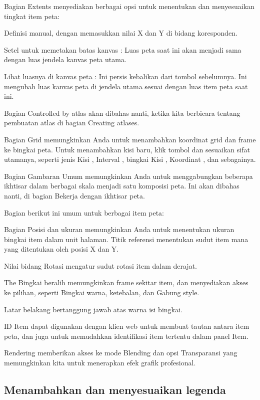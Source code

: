 \documentclass[]{book}
\begin{document}
Bagian Extents menyediakan berbagai opsi untuk menentukan dan menyesuaikan tingkat item peta:

Definisi manual, dengan memasukkan nilai X dan Y di bidang koresponden.

Setel untuk memetakan batas kanvas : Luas peta saat ini akan menjadi sama dengan luas jendela kanvas peta utama.

Lihat luasnya di kanvas peta : Ini persis kebalikan dari tombol sebelumnya. Ini mengubah luas kanvas peta di jendela utama sesuai dengan luas item peta saat ini.

Bagian Controlled by atlas akan dibahas nanti, ketika kita berbicara tentang pembuatan atlas di bagian Creating atlases.

Bagian Grid memungkinkan Anda untuk menambahkan koordinat grid dan frame ke bingkai peta. Untuk menambahkan kisi baru, klik tombol dan sesuaikan sifat utamanya, seperti jenis Kisi , Interval , bingkai Kisi , Koordinat , dan sebagainya.

Bagian Gambaran Umum memungkinkan Anda untuk menggabungkan beberapa ikhtisar dalam berbagai skala menjadi satu komposisi peta. Ini akan dibahas nanti, di bagian Bekerja dengan ikhtisar peta.

Bagian berikut ini umum untuk berbagai item peta:

Bagian Posisi dan ukuran memungkinkan Anda untuk menentukan ukuran bingkai item dalam unit halaman. Titik referensi menentukan sudut item mana yang ditentukan oleh posisi X dan Y.

Nilai bidang Rotasi mengatur sudut rotasi item dalam derajat.

The Bingkai beralih memungkinkan frame sekitar item, dan menyediakan akses ke pilihan, seperti Bingkai warna, ketebalan, dan Gabung style.

Latar belakang bertanggung jawab atas warna isi bingkai.

ID Item dapat digunakan dengan klien web untuk membuat tautan antara item peta, dan juga untuk memudahkan identifikasi item tertentu dalam panel Item.

Rendering memberikan akses ke mode Blending dan opsi Transparansi yang memungkinkan kita untuk menerapkan efek grafik profesional.

\hypertarget{menambahkan-dan-menyesuaikan-legenda}{%
\subsection{Menambahkan dan menyesuaikan legenda}\label{menambahkan-dan-menyesuaikan-legenda}}
\end{document}
